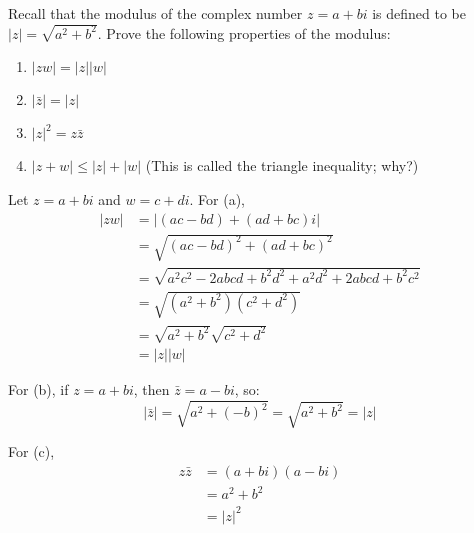   \begin{exercise}[Shifrin 2.3.3.a/b/c]
    Recall that the modulus of the complex number $z = a + bi$ is defined to be $|z| = \sqrt{a^2 + b^2}$. Prove the following properties of the modulus:
    \begin{enumerate}
      \item $|zw| = |z||w|$
      \item $|\bar{z}| = |z|$
      \item $|z|^2 = z\bar{z}$
      \item $|z + w| \leq |z| + |w|$ (This is called the triangle inequality; why?)
    \end{enumerate}
  \end{exercise}
  \begin{solution}
    Let $z = a + bi$ and $w = c + di$. For (a),
    \begin{align*}
      |zw| &= |(ac - bd) + (ad + bc)i| \\
      &= \sqrt{(ac - bd)^2 + (ad + bc)^2} \\
      &= \sqrt{a^2c^2 - 2abcd + b^2d^2 + a^2d^2 + 2abcd + b^2c^2} \\
      &= \sqrt{(a^2 + b^2)(c^2 + d^2)} \\
      &= \sqrt{a^2 + b^2}\sqrt{c^2 + d^2} \\
      &= |z||w|
    \end{align*}

    For (b), if $z = a + bi$, then $\bar{z} = a - bi$, so:
    \begin{equation}
      |\bar{z}| = \sqrt{a^2 + (-b)^2} = \sqrt{a^2 + b^2} = |z|
    \end{equation}

    For (c),
    \begin{align*}
      z\bar{z} &= (a + bi)(a - bi) \\
      &= a^2 + b^2 \\
      &= |z|^2
    \end{align*}
  \end{solution}


